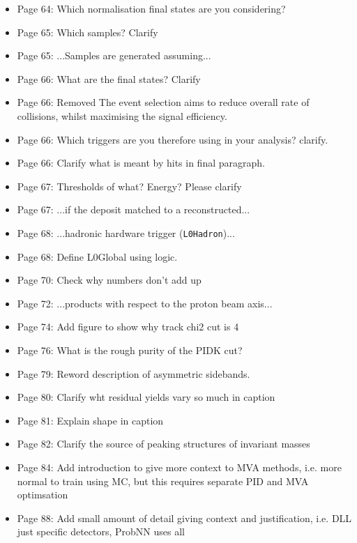 \documentclass[12pt]{article}
\begin{document}
\begin{itemize}
\item Page 64: {\color{blue} Which normalisation final states are you considering?}
\item Page 65: {\color{blue} Which samples? Clarify}
\item Page 65: ...Samples are {\color{red}generated} assuming...
\item Page 66: {\color{blue}What are the final states? Clarify}
\item Page 66: Removed {\color{red}The event selection aims to reduce overall rate of collisions, whilst maximising the signal efficiency.} 
\item Page 66: {\color{blue}Which triggers are you therefore using in your analysis? clarify.}
\item Page 66: {\color{blue}Clarify what is meant by hits in final paragraph.} 
\item Page 67: {\color{blue} Thresholds of what? Energy? Please clarify}
\item Page 67: ...if the {\color{red}deposit} matched to a reconstructed...
\item Page 68: ...hadronic {\color{red}hardware} trigger (\texttt{L0Hadron})...
\item Page 68: {\color{blue}Define L0Global using logic.}
\item Page 70: {\color{blue}Check why numbers don't add up}
\item Page 72: ...products {\color{red}with respect to the proton beam axis}... 
\item Page 74: {\color{blue}Add figure to show why track chi2 cut is 4}
\item Page 76: {\color{blue}What is the rough purity of the PIDK cut?}
\item Page 79: {\color{blue}Reword description of asymmetric sidebands.}
\item Page 80: {\color{blue}Clarify wht residual yields vary so much in caption}
\item Page 81: {\color{blue}Explain shape in caption}
\item Page 82: {\color{blue}Clarify the source of peaking structures of invariant masses}
\item Page 84: {\color{blue}Add introduction to give more context to MVA methods, i.e. more normal to train using MC, but this requires separate PID and MVA optimsation}
\item Page 88: {\color{blue} Add small amount of detail giving context and justification, i.e. DLL just specific detectors, ProbNN uses all}

\end{itemize}
\end{document}
